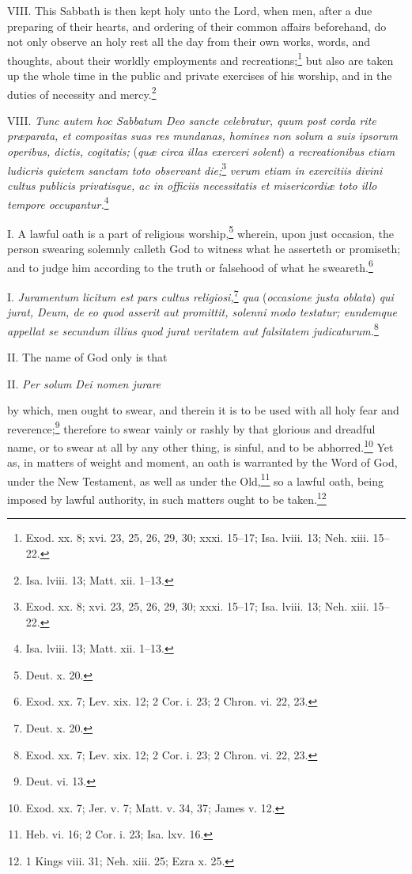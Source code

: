 VIII. This Sabbath is then kept holy unto the Lord, when men, after a due preparing of their hearts, and ordering of their common affairs beforehand, do not only observe an holy rest all the day from their own works, words, and thoughts, about their worldly employments and recreations;\footnote{Exod. xx. 8; xvi. 23, 25, 26, 29, 30; xxxi. 15–17; Isa. lviii. 13; Neh. xiii. 15–22.} but also are taken up the whole time in the public and private exercises of his worship, and in the duties of necessity and mercy.\footnote{Isa. lviii. 13; Matt. xii. 1–13.}

VIII. \emph{Tunc autem hoc Sabbatum Deo sancte celebratur, quum post corda rite præparata, et compositas suas res mundanas, homines non solum a suis ipsorum operibus, dictis, cogitatis; }(\emph{quæ circa illas exerceri solent})\emph{ a recreationibus etiam ludicris quietem sanctam toto observant die;}\footnote{Exod. xx. 8; xvi. 23, 25, 26, 29, 30; xxxi. 15–17; Isa. lviii. 13; Neh. xiii. 15–22.}\emph{ verum etiam in exercitiis divini cultus publicis privatisque, ac in officiis necessitatis et misericordiæ toto illo tempore occupantur.}\footnote{Isa. lviii. 13; Matt. xii. 1–13.}


I. A lawful oath is a part of religious worship,\footnote{Deut. x. 20.} wherein, upon just occasion, the person swearing solemnly calleth God to witness what he asserteth or promiseth; and to judge him according to the truth or falsehood of what he sweareth.\footnote{Exod. xx. 7; Lev. xix. 12; 2 Cor. i. 23; 2 Chron. vi. 22, 23.}

I. \emph{Juramentum licitum est pars cultus religiosi,}\footnote{Deut. x. 20.}\emph{ qua }(\emph{occasione justa oblata})\emph{ qui jurat, Deum, de eo quod asserit aut promittit, solenni modo testatur; eundemque appellat se secundum illius quod jurat veritatem aut falsitatem judicaturum.}\footnote{Exod. xx. 7; Lev. xix. 12; 2 Cor. i. 23; 2 Chron. vi. 22, 23.}

II. The name of God only is that

II. \emph{Per solum Dei nomen jurare }

by which, men ought to swear, and therein it is to be used with all holy fear and reverence;\footnote{Deut. vi. 13.} therefore to swear vainly or rashly by that glorious and dreadful name, or to swear at all by any other thing, is sinful, and to be abhorred.\footnote{Exod. xx. 7; Jer. v. 7; Matt. v. 34, 37; James v. 12.} Yet as, in matters of weight and moment, an oath is warranted by the Word of God, under the New Testament, as well as under the Old,\footnote{Heb. vi. 16; 2 Cor. i. 23; Isa. lxv. 16.} so a lawful oath, being imposed by lawful authority, in such matters ought to be taken.\footnote{1 Kings viii. 31; Neh. xiii. 25; Ezra x. 25.}

